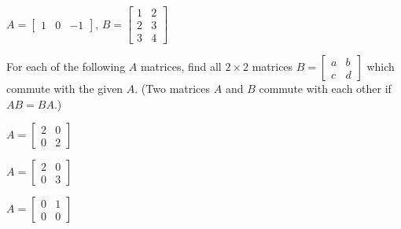 \item $A = \left[ \begin{array}{ccr} 1&0&-1 \end{array} \right]$, $B = \left[ \begin{array}{cc} 1&2 \\ 2&3 \\ 3&4\end{array} \right]$
\ea

\item For each of the following $A$ matrices, find all $2\times 2$ matrices $B=\left[ \begin{array}{cc} a&b\\c&d \end{array} \right]$ which commute with the given $A$. (Two matrices $A$ and $B$ commute with each other if $AB = BA$.)

\ba 
\begin{minipage}{1.5in}
\item $ A = \left[ \begin{array}{cc} 2&0 \\ 0 & 2 \end{array} \right]$
\end{minipage}
\begin{minipage}{1.5in}
\item $ A = \left[ \begin{array}{cc} 2&0 \\ 0 & 3 \end{array} \right]$
\end{minipage}
\begin{minipage}{1.5in}
\item $ A = \left[ \begin{array}{cc} 0&1 \\ 0 & 0 \end{array} \right]$
\end{minipage}
\ea

